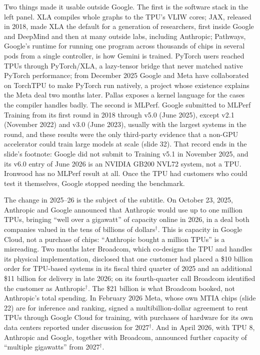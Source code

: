\documentclass[11pt,letterpaper]{article}
\begin{document}
Two things made it usable outside Google. The first is the software stack in the left panel. XLA compiles whole graphs to the TPU's VLIW cores; JAX, released in 2018, made XLA the default for a generation of researchers, first inside Google and DeepMind and then at many outside labs, including Anthropic; Pathways, Google's runtime for running one program across thousands of chips in several pods from a single controller, is how Gemini is trained. PyTorch users reached TPUs through PyTorch/XLA, a lazy-tensor bridge that never matched native PyTorch performance; from December 2025 Google and Meta have collaborated on TorchTPU to make PyTorch run natively, a project whose existence explains the Meta deal two months later. Pallas exposes a kernel language for the cases the compiler handles badly. The second is MLPerf. Google submitted to MLPerf Training from its first round in 2018 through v5.0 (June 2025), except v2.1 (November 2022) and v3.0 (June 2023), usually with the largest systems in the round, and these results were the only third-party evidence that a non-GPU accelerator could train large models at scale (slide 32). That record ends in the slide's footnote: Google did not submit to Training v5.1 in November 2025, and its v6.0 entry of June 2026 is an NVIDIA GB200 NVL72 system, not a TPU. Ironwood has no MLPerf result at all. Once the TPU had customers who could test it themselves, Google stopped needing the benchmark.

The change in 2025--26 is the subject of the subtitle. On October 23, 2025, Anthropic and Google announced that Anthropic would use up to one million TPUs, bringing ``well over a gigawatt'' of capacity online in 2026, in a deal both companies valued in the tens of billions of dollars$^\dagger$. This is capacity in Google Cloud, not a purchase of chips: ``Anthropic bought a million TPUs'' is a misreading. Two months later Broadcom, which co-designs the TPU and handles its physical implementation, disclosed that one customer had placed a \$10 billion order for TPU-based systems in its fiscal third quarter of 2025 and an additional \$11 billion for delivery in late 2026; on its fourth-quarter call Broadcom identified the customer as Anthropic$^\dagger$. The \$21 billion is what Broadcom booked, not Anthropic's total spending. In February 2026 Meta, whose own MTIA chips (slide 22) are for inference and ranking, signed a multibillion-dollar agreement to rent TPUs through Google Cloud for training, with purchases of hardware for its own data centers reported under discussion for 2027$^\dagger$. And in April 2026, with TPU 8, Anthropic and Google, together with Broadcom, announced further capacity of ``multiple gigawatts'' from 2027$^\dagger$.
\end{document}
